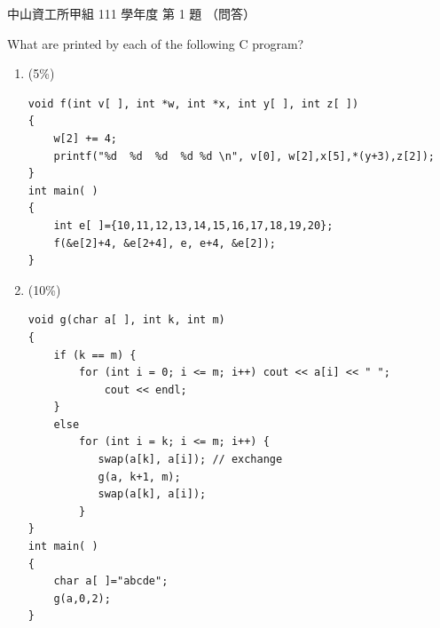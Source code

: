 \begin{pastexam}[label={px:nsysu-111-osds-01}]{中山資工所甲組 111 學年度 第 1 題}
（問答）

What are printed by each of the following C program?
\begin{enumerate}[label=(\alph*)]
\item (5\%)
\begin{verbatim}
void f(int v[ ], int *w, int *x, int y[ ], int z[ ])
{
    w[2] += 4;
    printf("%d  %d  %d  %d %d \n", v[0], w[2],x[5],*(y+3),z[2]);
}
int main( )
{
    int e[ ]={10,11,12,13,14,15,16,17,18,19,20};
    f(&e[2]+4, &e[2+4], e, e+4, &e[2]);
}
\end{verbatim}
\item (10\%)
\begin{verbatim}
void g(char a[ ], int k, int m)
{
    if (k == m) {
        for (int i = 0; i <= m; i++) cout << a[i] << " ";
            cout << endl;
    }
    else
        for (int i = k; i <= m; i++) {
           swap(a[k], a[i]); // exchange
           g(a, k+1, m);
           swap(a[k], a[i]);
        }
}
int main( )
{
    char a[ ]="abcde";
    g(a,0,2);
}
\end{verbatim}
\end{enumerate}
\end{pastexam}

